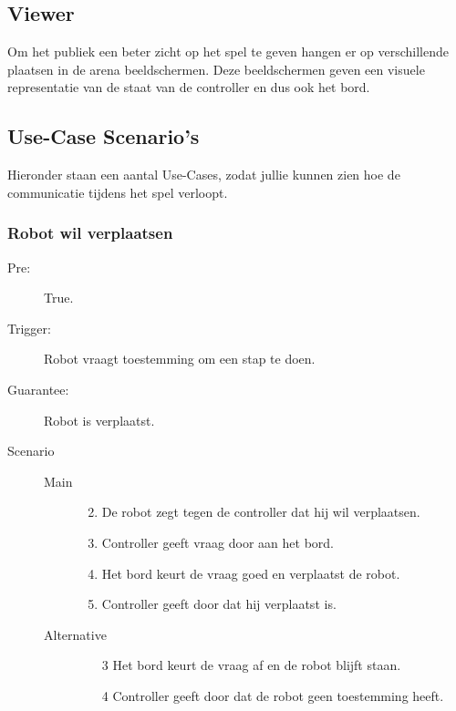 \subsection{Viewer}

Om het publiek een beter zicht op het spel te geven hangen er op verschillende plaatsen in de arena beeldschermen. Deze beeldschermen geven een visuele representatie van de staat van de controller en dus ook het bord.

\subsection{Use-Case Scenario's}
Hieronder staan een aantal Use-Cases, zodat jullie kunnen zien hoe de communicatie tijdens het spel verloopt.
\subsubsection*{Robot wil verplaatsen}
\begin{description}
  \item[Pre:] True.
  \item[Trigger:] Robot vraagt toestemming om een stap te doen.
  \item[Guarantee:] Robot is verplaatst.
  \item[Scenario]
    \begin{description}
        \item[]
        \item[Main]
            \begin{enumerate}
              \item[]
              \item De robot zegt tegen de controller dat hij wil verplaatsen.
              \item Controller geeft vraag door aan het bord.
              \item Het bord keurt de vraag goed en verplaatst de robot.
              \item Controller geeft door dat hij verplaatst is.
            \end{enumerate}
        \item[Alternative]
            \begin{itemize}
                \item[]
                \item[3] Het bord keurt de vraag af en de robot blijft staan.
                \item[4] Controller geeft door dat de robot geen toestemming heeft.
            \end{itemize}
    \end{description}
\end{description}
\newpage
